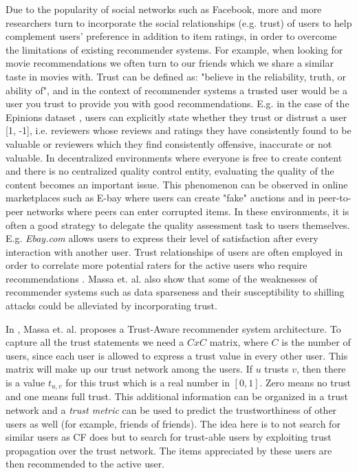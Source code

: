 Due to the popularity of social networks such as Facebook, more and more
researchers turn to incorporate the social relationships (e.g. trust) of users
to help complement users’ preference in addition to item ratings, in order to
overcome the limitations of existing recommender systems. For example, when
looking for movie recommendations we often turn to our friends which we share a
similar taste in movies with. Trust can be defined as: "believe in the
reliability, truth, or ability of", and in the context of recommender systems a
trusted user would be a user you trust to provide you with good
recommendations. E.g. in the case of the Epinions dataset \cite{Epinions},
users can explicitly state whether they trust or distrust a user [1, -1], i.e.
reviewers whose reviews and ratings they have consistently found to be valuable
or reviewers which they find consistently offensive, inaccurate or not
valuable. In decentralized environments where everyone is free to create
content and there is no centralized quality control entity, evaluating the
quality of the content becomes an important issue. This phenomenon can be
observed in online marketplaces such as E-bay where users can create "fake"
auctions and in peer-to-peer networks where peers can enter corrupted items. In
these environments, it is often a good strategy to delegate the quality
assessment task to users themselves. E.g. \emph{Ebay.com} allows users to
express their level of satisfaction after every interaction with another user.
Trust relationships of users are often employed in order to correlate more
potential raters for the active users who require recommendations
\cite{Massa2004, Massa2007}. Massa et. al. \cite{Massa2004} also show that some
of the weaknesses of recommender systems such as data sparseness and their
susceptibility to shilling attacks could be alleviated by incorporating trust.

In \cite{Massa2004}, Massa et. al. proposes a Trust-Aware recommender system
architecture.  To capture all the trust statements we need a $CxC$ matrix,
where $C$ is the number of users, since each user is allowed to express a trust
value in every other user. This matrix will make up our trust network among the
users. If $u$ trusts $v$, then there is a value $t_{u,v}$ for this trust which
is a real number in $[0,1]$. Zero means no trust and one means full trust. This
additional information can be organized in a trust network and a \emph{trust
metric} can be used to predict the trustworthiness of other users as well (for
example, friends of friends). The idea here is to not search for similar users
as CF does but to search for trust-able users by exploiting trust propagation
over the trust network. The items appreciated by these users are then
recommended to the active user.

